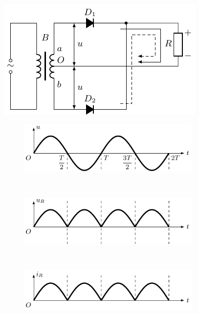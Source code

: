 \begin{figure}[htbp]
    \centering
    \begin{minipage}[b]{0.42\linewidth}
    	 \centering
    	\includegraphics{fig/C/3-33.pdf}
    	\begin{subfigure}{0.001\linewidth}%
    	\end{subfigure}
    	\caption{}\label{fig_C_3-33}
    \end{minipage}
     \begin{minipage}[b]{0.54\linewidth}
     	\centering
    	\begin{subfigure}{0.99\linewidth}
    		\centering
    		\includegraphics{fig/C/3-34a.pdf}
    		\caption{}\label{fig_C_3-34a}
    	\end{subfigure}
    	\\
    	\begin{subfigure}{0.99\linewidth}
    		\centering
    		\includegraphics{fig/C/3-34b.pdf}
    		\caption{}\label{fig_C_3-34b}
    	\end{subfigure}
    	\\
    	\begin{subfigure}{0.99\linewidth}
    		\centering
    		\includegraphics{fig/C/3-34c.pdf}
    		\caption{}\label{fig_C_3-34c}
    	\end{subfigure}
    	\caption{}\label{fig_C_3-34}
    \end{minipage}
\end{figure}

